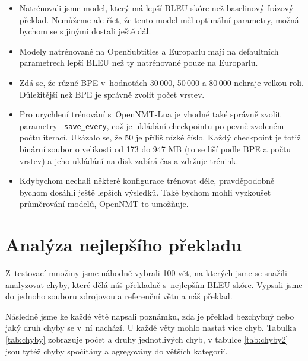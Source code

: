 \documentclass[a4]{article}
\begin{document}
\begin{itemize}

\item Natrénovali jsme model, který má lepší BLEU skóre než baselinový frázový
překlad. Nemůžeme ale říct, že tento model měl optimální parametry, možná
bychom se s jinými dostali ještě dál.

\item Modely natrénované na OpenSubtitles a Europarlu mají na defaultních
parametrech lepší BLEU než ty
natrénované pouze na Europarlu. 

\item Zdá se, že různé BPE v~hodnotách 30\,000, 50\,000 a 80\,000 nehraje
velkou roli. Důležitější než BPE je správně zvolit počet vrstev.

\item Pro urychlení trénování s~OpenNMT-Lua je vhodné také správně zvolit parametry
\texttt{-save\_every}, což je ukládání checkpointu po pevně zvoleném počtu
iterací. Ukázalo se, že 50 je příliš nízké číslo. Každý checkpoint je totiž
binární soubor o velikosti od 173 do 947 MB (to se liší podle BPE a počtu
vrstev) a jeho ukládání na disk zabírá čas a zdržuje trénink.

\item Kdybychom nechali některé konfigurace trénovat déle, pravděpodobně
bychom dosáhli ještě lepších výsledků. Také bychom mohli vyzkoušet
průměrování modelů, OpenNMT to umožňuje. 
  


\end{itemize}



\section{Analýza nejlepšího překladu}

Z~testovací množiny jsme náhodně vybrali 100 vět, na kterých jsme se
snažili analyzovat chyby, které dělá náš překladač s~nejlepším BLEU skóre.
Vypsali jsme do jednoho souboru zdrojovou a referenční větu a náš překlad.

Následně jsme ke každé větě napsali poznámku, zda je překlad bezchybný nebo
jaký druh chyby se v~ní nachází. U každé věty mohlo nastat více chyb. Tabulka
\ref{tab:chyby} zobrazuje počet a druhy jednotlivých chyb, v tabulce
\ref{tab:chyby2} jsou tytéž chyby spočítány a agregovány do větších kategorií.
\end{document}
